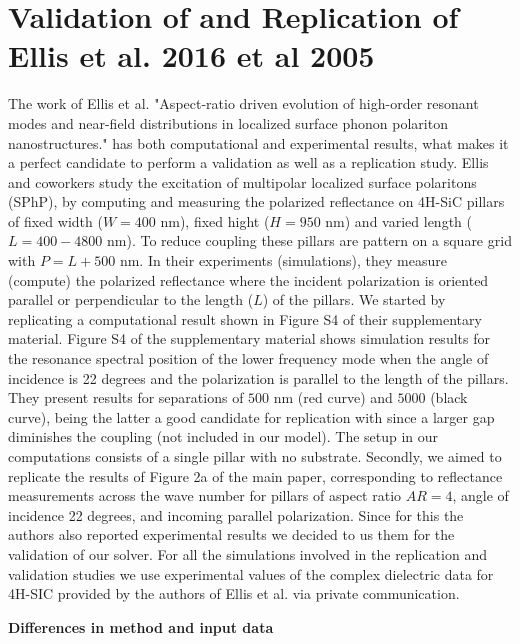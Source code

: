 
\section{Validation of \pygbe and Replication of Ellis et al. 2016  et al 2005} \label{sec:rep_val_ellis}
\graphicspath{{replication_validation/figs/}}

The work of Ellis et al. "Aspect-ratio driven evolution of high-order resonant modes and near-field distributions in
localized surface phonon polariton nanostructures." \cite{ellis2016} has both computational and experimental results, what makes 
it a perfect candidate to perform a validation as well as a replication study. Ellis and coworkers study the excitation of 
multipolar localized surface polaritons (SPhP), by computing and measuring the polarized reflectance on 4H-SiC pillars of
fixed width ($W = 400$ nm), fixed hight ($H=950$ nm) and varied length ($L=400-4800$ nm). To reduce coupling these pillars are 
pattern on a square grid with $P = L + 500$ nm. In their experiments (simulations), they measure (compute) the polarized reflectance
where the incident polarization is oriented parallel or perpendicular to the length ($L$) of the pillars.
We started by replicating a computational result shown in Figure S4 of their supplementary material. Figure S4 of the 
supplementary material shows simulation results for the resonance spectral position of the lower frequency mode when the angle of 
incidence is 22 degrees and the polarization is parallel to the length of the pillars. They present results for separations of $500$ nm 
(red curve) and $5000$ (black curve), being the latter a good candidate for replication with \pygbe since a larger gap diminishes 
the coupling (not included in our model). The setup in our computations consists of a single pillar with no substrate.
Secondly, we aimed to replicate the results of Figure 2a of the main paper, 
corresponding to reflectance measurements across the wave number for pillars of aspect ratio $AR=4$, angle of incidence 22 degrees, 
and incoming parallel polarization. Since for this the authors also reported experimental results we decided to us them for the 
validation of our solver.
For all the simulations involved in the replication and validation studies we use experimental values of the complex dielectric data 
for 4H-SIC provided by the authors of Ellis et al. via private communication. 

\textbf{Differences in method and input data}

